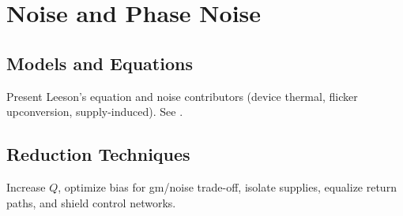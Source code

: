 \chapter{Noise and Phase Noise}
\section{Models and Equations}
Present Leeson's equation and noise contributors (device thermal, flicker upconversion, supply-induced). See \cite{leeson1966,razavi_rf}.
\section{Reduction Techniques}
Increase \(Q\), optimize bias for gm/noise trade-off, isolate supplies, equalize return paths, and shield control networks.


